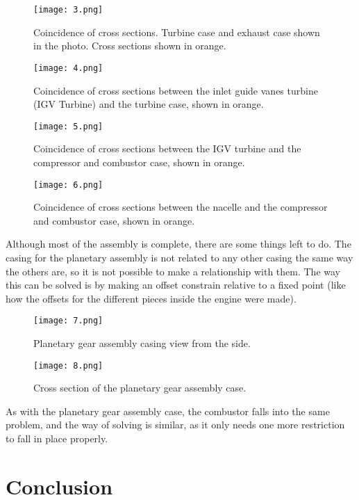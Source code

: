 \documentclass[12pt, letterpaper]{article}
\begin{document}
\begin{figure}[H]
	\centering
	\texttt{[image: 3.png]}
	\caption{Coincidence of cross sections. Turbine case and exhaust case shown in the photo. Cross sections shown in orange.}
\end{figure}

\begin{figure}[H]
	\centering
	\texttt{[image: 4.png]}
	\caption{Coincidence of cross sections between the inlet guide vanes turbine (IGV Turbine) and the turbine case, shown in orange.}
\end{figure}

\begin{figure}[H]
	\centering
	\texttt{[image: 5.png]}
	\caption{Coincidence of cross sections between the IGV turbine and the compressor and combustor case, shown in orange.}
\end{figure}

\begin{figure}[H]
	\centering
	\texttt{[image: 6.png]}
	\caption{Coincidence of cross sections between the nacelle and the compressor and combustor case, shown in orange.}
\end{figure}


Although most of the assembly is complete, there are some things left to do. The casing for the planetary assembly is not related to any other casing the same way the others are, so it is not possible to make a relationship with them. The way this can be solved is by making an offset constrain relative to a fixed point (like how the offsets for the different pieces inside the engine were made). 

\begin{figure}[H]
	\centering
	\texttt{[image: 7.png]}
	\caption{Planetary gear assembly casing view from the side.}
\end{figure}

\begin{figure}[H]
	\centering
	\texttt{[image: 8.png]}
	\caption{Cross section of the planetary gear assembly case.}
\end{figure}

As with the planetary gear assembly case, the combustor falls into the same problem, and the way of solving is similar, as it only needs one more restriction to fall in place properly.

\section*{Conclusion}
\end{document}
